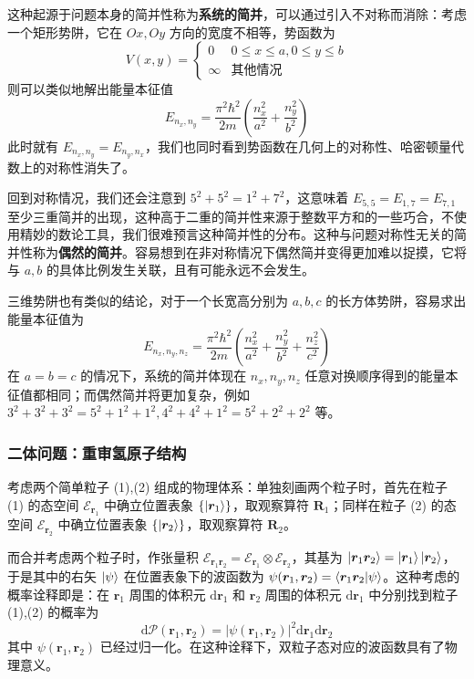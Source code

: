 \documentclass[cn,10pt,math=newtx,citestyle=gb7714-2015,bibstyle=gb7714-2015]{elegantbook}
\def\bm{\boldsymbol}
\def\ms{\mathscr}
\def\d{\mathrm d}
\def\ox{\otimes}
\def\P{\mathcal P}
\begin{document}
这种起源于问题本身的简并性称为\textbf{系统的简并}，可以通过引入不对称而消除：考虑一个矩形势阱，它在 $Ox,Oy$ 方向的宽度不相等，势函数为
\begin{equation}
    V(x,y) = \begin{cases}
        0 & 0\le x \le a, 0\le y\le b\\
        \infty & \text{其他情况}
    \end{cases}
\end{equation}
则可以类似地解出能量本征值
\begin{equation}
    E_{n_x,n_y} = \frac{\pi^2\hbar^2}{2m}\left(\frac{n_x^2}{a^2}+\frac{n_y^2}{b^2}\right)
\end{equation}
此时就有 $E_{n_x,n_y}=E_{n_y,n_x}$，我们也同时看到势函数在几何上的对称性、哈密顿量代数上的对称性消失了。

回到对称情况，我们还会注意到 $5^2+5^2=1^2+7^2$，这意味着 $E_{5,5} = E_{1,7} = E_{7,1}$ 至少三重简并的出现，这种高于二重的简并性来源于整数平方和的一些巧合，不使用精妙的数论工具，我们很难预言这种简并性的分布。这种与问题对称性无关的简并性称为\textbf{偶然的简并}。容易想到在非对称情况下偶然简并变得更加难以捉摸，它将与 $a,b$ 的具体比例发生关联，且有可能永远不会发生。

三维势阱也有类似的结论，对于一个长宽高分别为 $a,b,c$ 的长方体势阱，容易求出能量本征值为
\begin{equation}
    E_{n_x,n_y,n_z} = \frac{\pi^2\hbar^2}{2m}\left(\frac{n_x^2}{a^2}+\frac{n_y^2}{b^2}+\frac{n_z^2}{c^2}\right)
\end{equation}
在 $a=b=c$ 的情况下，系统的简并体现在 $n_x,n_y,n_z$ 任意对换顺序得到的能量本征值都相同；而偶然简并将更加复杂，例如 $3^2+3^2+3^2 = 5^2+1^2+1^2, 4^2+4^2+1^2 = 5^2+2^2+2^2$ 等。

\subsubsection{二体问题：重审氢原子结构}
考虑两个简单粒子 (1),(2) 组成的物理体系：单独刻画两个粒子时，首先在粒子 (1) 的态空间 $\ms E_{\bm r_1}$ 中确立位置表象 $\{\ket{\bm r_1}\}$，取观察算符 $\bm R_1$；同样在粒子 (2) 的态空间 $\ms E_{\bm r_2}$ 中确立位置表象 $\{\ket{\bm r_2}\}$，取观察算符 $\bm R_2$。

而合并考虑两个粒子时，作张量积 $\ms E_{\bm r_1\bm r_2} = \ms E_{\bm r_1}\ox\ms E_{\bm r_2}$，其基为 $\ket{\bm r_1\bm r_2} = \ket{\bm r_1}\ket{\bm r_2}$，于是其中的右矢 $\ket{\psi}$ 在位置表象下的波函数为 $\psi(\bm r_1,\bm r_2)=\braket{\bm r_1\bm r_2|\psi}$。这种考虑的概率诠释即是：在 $\bm r_1$ 周围的体积元 $\d\bm r_1$ 和 $\bm r_2$ 周围的体积元 $\d\bm r_1$ 中分别找到粒子 (1),(2) 的概率为
\begin{equation}
    \d\P(\bm r_1,\bm r_2) = |\psi(\bm r_1,\bm r_2)|^2\d\bm r_1\d\bm r_2
\end{equation}
其中 $\psi(\bm r_1,\bm r_2)$ 已经过归一化。在这种诠释下，双粒子态对应的波函数具有了物理意义。
\end{document}

